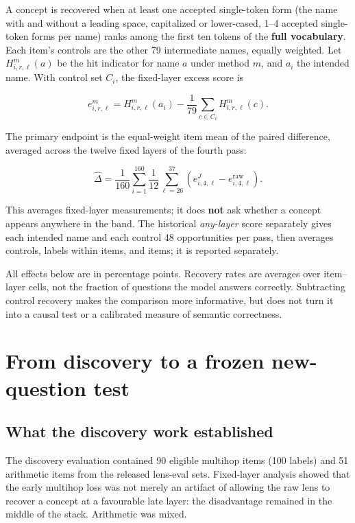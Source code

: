 A concept is recovered when at least one accepted single-token form (the
name with and without a leading space, capitalized or lower-cased, 1--4
accepted single-token forms per name) ranks among the first ten tokens
of the \textbf{full vocabulary}. Each item's controls are the other 79
intermediate names, equally weighted. Let \(H_{i,r,\ell}^{m}(a)\) be the
hit indicator for name \(a\) under method \(m\), and \(a_i\) the
intended name. With control set \(C_i\), the fixed-layer excess score is

\[
e_{i,r,\ell}^{m}=H_{i,r,\ell}^{m}(a_i)
-\frac{1}{79}\sum_{c\in C_i}H_{i,r,\ell}^{m}(c).
\]

The primary endpoint is the equal-weight item mean of the paired
difference, averaged across the twelve fixed layers of the fourth pass:

\[
\widehat{\Delta}
=\frac{1}{160}\sum_{i=1}^{160}\frac{1}{12}
\sum_{\ell=26}^{37}\left(e_{i,4,\ell}^{J}-e_{i,4,\ell}^{\mathrm{raw}}\right).
\]

This averages fixed-layer measurements; it does \textbf{not} ask whether
a concept appears anywhere in the band. The historical \emph{any-layer}
score separately gives each intended name and each control 48
opportunities per pass, then averages controls, labels within items, and
items; it is reported separately.

All effects below are in percentage points. Recovery rates are averages
over item--layer cells, not the fraction of questions the model answers
correctly. Subtracting control recovery makes the comparison more
informative, but does not turn it into a causal test or a calibrated
measure of semantic correctness.

\section{From discovery to a frozen new-question
test}\label{from-discovery-to-a-frozen-new-question-test}

\subsection{What the discovery work
established}\label{what-the-discovery-work-established}

The discovery evaluation contained 90 eligible multihop items (100
labels) and 51 arithmetic items from the released lens-eval sets.
Fixed-layer analysis showed that the early multihop loss was not merely
an artifact of allowing the raw lens to recover a concept at a
favourable late layer: the disadvantage remained in the middle of the
stack. Arithmetic was mixed.

